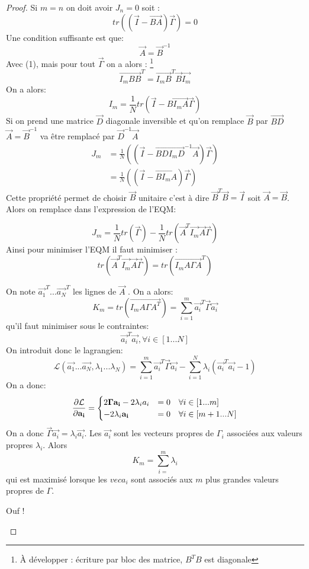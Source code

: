 \documentclass[main.tex]{subfiles}
\begin{document}
\begin{proof}
      Si $m=n$ on doit avoir $J_n  = 0$ soit :
        \[
          tr((\vec{I}-\vec{BA})\vec{\Gamma}) = 0
        \]
        Une condition suffisante est que:
        \[
          \vec{A} = \vec{B}^{-1}
        \]
        Avec (1), mais pour tout $\vec{\Gamma}$ on a alors : \footnote{À développer : écriture par bloc des matrice, $B^TB$ est diagonale }
        \[
          \vec{I_mBB}^T = \vec{I_mB}^T\vec{B}\vec{I_m}
        \]
        On a alors:
        \[
          I_m = \frac{1}{N}tr(\vec{I}-\vec{BI_mA}\vec{\Gamma})
        \]
        Si on prend une matrice $\vec{D}$ diagonale inversible et qu'on remplace $\vec{B}$ par $\vec{BD}$ $\vec{A}= \vec{B}^{-1}$ va être remplacé par $\vec{D}^{-1}\vec{A}$
        \begin{align*}
          J_m &= \frac{1}{N}((\vec{I}-\vec{BDI_mD}^{-1}\vec{A})\vec{\Gamma}) \\
              &= \frac{1}{N}((\vec{I}-\vec{BI_mA})\vec{\Gamma})
        \end{align*}
        Cette propriété permet de choisir $\vec{B}$ unitaire c'est à dire $\vec{B}^T\vec{B} = \vec{I} $ soit $\vec{A}=\vec{B}$. Alors on remplace dans l'expression de l'EQM:

        \[
          J_m = \frac{1}{N}tr(\vec{\Gamma}) - \frac{1}{N}tr(\vec{A}^T\vec{I_m}\vec{A}\vec{\Gamma})
        \]
        Ainsi pour minimiser l'EQM il faut minimiser :
        \[
          tr(\vec{A}^T\vec{I_m}\vec{A}\vec{\Gamma}) = tr(\vec{I_mA\Gamma A}^T)
        \]

        On note $\vec{a_1}^T ... \vec{a_N}^T $ les lignes de $\vec{A}$ . On a alors:
        \[
          K_m = tr(\vec{I_mA\Gamma A^T}) = \sum_{i=1}^{m}\vec{a_i}^T\vec{\Gamma}\vec{a_i}
        \]
        qu'il faut minimiser sous le contraintes:
        \[
          \vec{a_i}^T\vec{a_i}, \forall i \in [1 ... N]
        \]
        On introduit donc le lagrangien:
        \[
          \mathcal{L}(\vec{a_1} ...\vec{a_N},\lambda_1 ... \lambda_N) = \sum_{i=1}^{m}\vec{a_i}^T\vec{\Gamma}\vec{a_i} - \sum_{i=1}^{N}\lambda_i(\vec{a_i}^T\vec{a_i}-1)
        \]
        On a donc:
        \[
          \derivp[\mathcal{L}]{\vec{a_i}}=
          \begin{cases}
            2\vec{\Gamma}\vec{a_i}-2\lambda_ia_i & = 0 \quad \forall i \in [1...m] \\
            -2 \lambda_i\vec{a_i}           & = 0 \quad \forall i \in [m+1...N]
          \end{cases}
        \]
        On a donc $\vec{\Gamma}\vec{a_i} = \lambda_i \vec{a_i}$.
        Les $\vec{a_i}$ sont les vecteurs propres de $\Gamma_i$ associées aux valeurs propres $\lambda_i$. Alors
        \[
          K_m = \sum_{i=}^{m}\lambda_i
        \]
        qui est maximisé lorsque les $vec{a_i}$ sont associés aux $m$ plus grandes valeurs propres de $\Gamma$.

\begin{flushright}
Ouf !
\end{flushright}

\end{proof}
\end{document}
